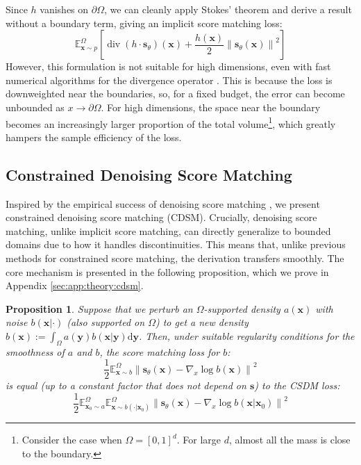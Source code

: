 \documentclass{article}
\theoremstyle{plain}
\newtheorem{proposition}[theorem]{Proposition}
\theoremstyle{definition}
\theoremstyle{remark}
\DeclareMathOperator{\ddiv}{div}
\newcommand{\E}{\mathbb{E}}
\newcommand{\sqbrac}[1]{\left[#1\right]}
\newcommand{\norm}[1]{\left\|#1\right\|}
\newcommand{\grad}{\nabla}
\renewcommand{\vec}{\mathbf}
\newcommand{\dd}{\mathrm{d}}
\begin{document}
Since $h$ vanishes on $\partial \Omega$, we can cleanly apply Stokes' theorem and derive a result without a boundary term, giving an implicit score matching loss:
\begin{equation}\label{eqn:bsmregimp}
    \E_{\vec{x} \sim p}^{\Omega}\sqbrac{\ddiv(h \cdot \vec{s}_\theta)(\vec{x}) + \frac{h(\vec{x})}{2}\norm{\vec{s}_\theta(\vec{x})}^2}
\end{equation}
However, this formulation is not suitable for high dimensions, even with fast numerical algorithms for the divergence operator \citep{Hutchinson1989ASE, Song2019SlicedSM}. This is because the loss is downweighted near the boundaries, so, for a fixed budget, the error can become unbounded as $x \to \partial \Omega$. For high dimensions, the space near the boundary becomes an increasingly larger proportion of the total volume\footnote{Consider the case when $\Omega = [0, 1]^d$. For large $d$, almost all the mass is close to the boundary.}, which greatly hampers the sample efficiency of the loss.

\subsection{Constrained Denoising Score Matching}

Inspired by the empirical success of denoising score matching \citep{Vincent2011ACB, Song2019GenerativeMB}, we present constrained denoising score matching (CDSM). Crucially, denoising score matching, unlike implicit score matching, can directly generalize to bounded domains due to how it handles discontinuities. This means that, unlike previous methods for constrained score matching, the derivation transfers smoothly. The core mechanism is presented in the following proposition, which we prove in Appendix \ref{sec:app:theory:cdsm}.
\begin{proposition}\label{prop:cdsm}
    Suppose that we perturb an $\Omega$-supported density $a(\vec{x})$ with noise $b(\vec{x} | \cdot)$ (also supported on $\Omega$) to get a new density $b(\vec{x}) := \int_\Omega a(\vec{y}) b(\vec{x} | \vec{y}) \dd \vec{y}$. Then, under suitable regularity conditions for the smoothness of $a$ and $b$, the score matching loss for $b$:
    \begin{equation}\label{eqn:pertbsm}
        \frac{1}{2} \E_{\vec{x} \sim b}^\Omega \norm{\vec{s}_\theta(\vec{x}) - \grad_x \log b(\vec{x})}^2
    \end{equation}
    is equal (up to a constant factor that does not depend on $\vec{s}$) to the CSDM loss:
    \begin{equation}\label{eqn:pertcdsm}
        \frac{1}{2} \E_{\vec{x}_0 \sim a}^\Omega \E_{\vec{x} \sim b(\cdot | \vec{x}_0)}^\Omega \norm{\vec{s}_\theta(\vec{x}) - \grad_x \log b(\vec{x} | \vec{x}_0)}^2
    \end{equation}
\end{proposition}
\end{document}
